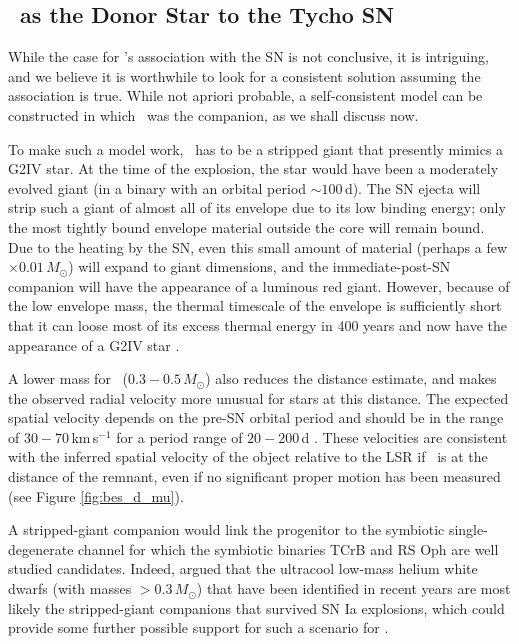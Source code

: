 \subsection{\starg\ as the Donor Star to the Tycho SN}
\label{redgiant}


While the case for \starg's association with the SN is not conclusive, it is intriguing, and we believe it is worthwhile to look for a consistent solution assuming the association is true.
While not {apriori} probable, a self-consistent model can be constructed in which \starg\ was the companion, as we shall discuss now.

To make such a model work, \starg\ has to be a stripped giant that
presently mimics a G2IV star. At the time of the explosion, the star
would have been a moderately evolved giant (in a binary with an
orbital period $\sim 100\,$d). The SN ejecta will strip such a giant
of almost all of its envelope \citep{2000ApJS..128..615M} due to its low binding energy; only the most tightly bound envelope material
outside the core will remain bound. Due to the heating by the SN,
even this small amount of material (perhaps a few $\times
0.01\,M_{\odot}$) will expand to giant dimensions, and the
immediate-post-SN companion will have the appearance of a luminous red
giant. However, because of the low envelope mass, the thermal
timescale of the envelope is sufficiently short that it can loose most
of its excess thermal energy in 400 years and now have the appearance
of a G2IV star \citep{2003astro.ph..3660P}.

A lower mass for \starg\ ($0.3-0.5\,M_\odot$) also
reduces the distance estimate, and makes the observed radial velocity more unusual for stars at this distance.
The expected spatial velocity depends on the
pre-SN orbital period and should be in the range of
$30-70\,$km\,s$^{-1}$ for a period range of $20-200\,$d \citep[]{Justham:2008nx}. These velocities are consistent with the
inferred spatial velocity of the object relative to the LSR if \starg\
is at the distance of the remnant, even if no significant proper motion has been measured (see Figure \ref{fig:bes_d_mu}).

A stripped-giant companion would link the progenitor to the symbiotic
single-degenerate channel \citep{1999ApJ...522..487H} for which the
symbiotic binaries TCrB and RS Oph are well studied
candidates. Indeed, \citep[]{Justham:2008nx} argued that
the ultracool low-mass helium white dwarfs (with masses $>
0.3\,M_\odot$) that have been identified in recent years are most
likely the stripped-giant companions that survived SN Ia explosions, 
which could provide some further possible support for such a scenario for
\starg.

